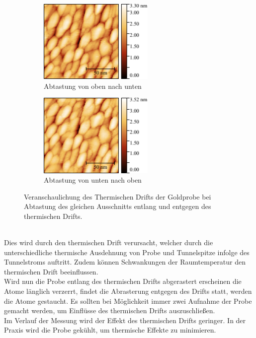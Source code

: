 \documentclass[a4paper,twoside,final]{article}
\begin{document}
\begin{figure}[htp]
    \centering
    \begin{subfigure}{0.45\textwidth}
        \includegraphics[height=4cm]{Bilder/Image01966_Drift_obenunten.pdf}
        \caption{Abtastung von oben nach unten}
    \end{subfigure}
    \hspace{0.5cm}
    \begin{subfigure}{0.45\textwidth}
        \includegraphics[height=4cm]{Bilder/Image01965_Drift_untenoben.pdf}
        \caption{Abtastung von unten nach oben}
    \end{subfigure}
    \caption{Veranschaulichung des Thermischen Drifts der Goldprobe bei Abtastung des gleichen Ausschnitts entlang und entgegen des thermischen Drifts.}
    \label{fig:ThermischerDrift}
\end{figure}\\
Dies wird durch den thermischen Drift verursacht, welcher durch die unterschiedliche thermische Ausdehnung von Probe und Tunnelspitze infolge des Tunnelstroms auftritt. Zudem können Schwankungen der Raumtemperatur den thermischen Drift beeinflussen.\\
Wird nun die Probe entlang des thermischen Drifts abgerastert erscheinen die Atome länglich verzerrt, findet die Abrasterung entgegen des Drifts statt, werden die Atome gestaucht. Es sollten bei Möglichkeit immer zwei Aufnahme der Probe gemacht werden, um Einflüsse des thermischen Drifts auszuschließen.\\
Im Verlauf der Messung wird der Effekt des thermischen Drifts geringer. In der Praxis wird die Probe gekühlt, um thermische Effekte zu minimieren.
\end{document}
